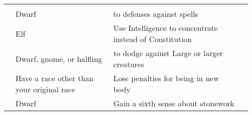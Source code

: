 {\begin{longtabu}{>{\lcol}p{10em} >{\lcol}p{15em} >{\lcol}X >{\lcol}p{3em}}
    \midrule
     &  &  &  \\
     & Dwarf &  to defenses against spells &  \\
     & Elf & Use Intelligence to concentrate instead of Constitution &  \\
     & Dwarf, gnome, or halfling &  to dodge against Large or larger creatures &  \\
     & Have a race other than your original race & Lose penalties for being in new body &  \\
     & Dwarf & Gain a sixth sense about stonework &  \\


\end{longtabu}}
